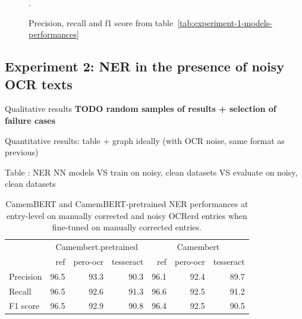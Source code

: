 \begin{figure}[h!]
	  \caption{\label{fig:f1-vs-trainsize} Precision, recall and f1 score from table~\ref{tab:experiment-1-models-performances}}.
\end{figure}
	                                        


\subsection{Experiment 2: NER in the presence of noisy OCR texts}

Qualitative results
\textbf{TODO random samples of results + selection of failure cases}

Quantitative results: table + graph ideally (with OCR noise, same format as previous)

Table : NER NN models VS train on {noisy, clean} datasets VS evaluate on {noisy, clean} datasets

\begin{table}
\caption{CamemBERT and CamemBERT-pretrained NER performances at entry-level on manually corrected and noisy OCRerd entries when fine-tuned on manually corrected entries.}
\begin{tabular}{lrrrrrr}
{} & \multicolumn{3}{c}{Camembert.pretrained} & \multicolumn{3}{c}{Camembert} \\
{} &                  ref & pero-ocr & tesseract &       ref & pero-ocr & tesseract \\
\midrule
Precision &                 96.5 &     93.3 &      90.3 &      96.1 &     92.4 &      89.7 \\
Recall    &                 96.5 &     92.6 &      91.3 &      96.6 &     92.5 &      91.2 \\
F1 score        &                 96.5 &     92.9 &      90.8 &      96.4 &     92.5 &      90.5 \\
\bottomrule
\end{tabular}
\end{table}

